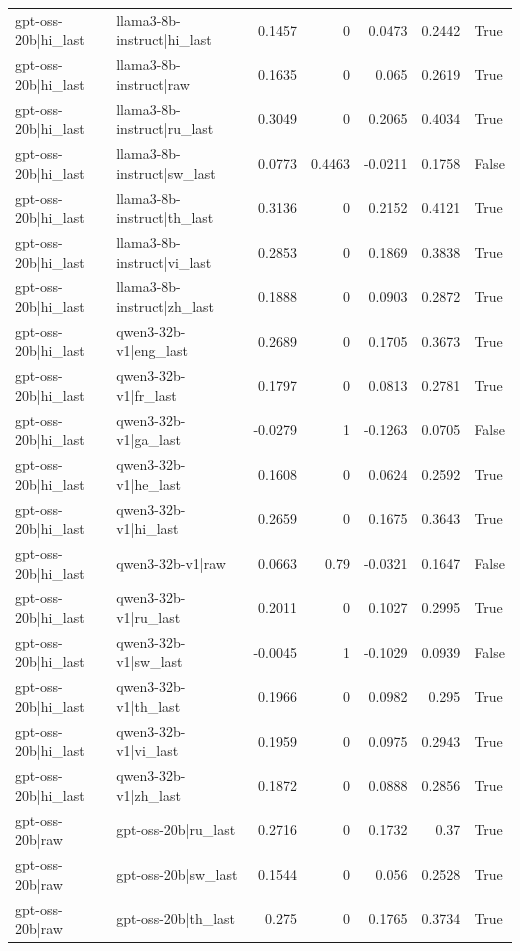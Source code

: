 \begin{table}
\begin{tabular}{l l r r r r l}
gpt-oss-20b|hi_last & llama3-8b-instruct|hi_last & 0.1457 & 0 & 0.0473 & 0.2442 & True \\
gpt-oss-20b|hi_last & llama3-8b-instruct|raw & 0.1635 & 0 & 0.065 & 0.2619 & True \\
gpt-oss-20b|hi_last & llama3-8b-instruct|ru_last & 0.3049 & 0 & 0.2065 & 0.4034 & True \\
gpt-oss-20b|hi_last & llama3-8b-instruct|sw_last & 0.0773 & 0.4463 & -0.0211 & 0.1758 & False \\
gpt-oss-20b|hi_last & llama3-8b-instruct|th_last & 0.3136 & 0 & 0.2152 & 0.4121 & True \\
gpt-oss-20b|hi_last & llama3-8b-instruct|vi_last & 0.2853 & 0 & 0.1869 & 0.3838 & True \\
gpt-oss-20b|hi_last & llama3-8b-instruct|zh_last & 0.1888 & 0 & 0.0903 & 0.2872 & True \\
gpt-oss-20b|hi_last & qwen3-32b-v1|eng_last & 0.2689 & 0 & 0.1705 & 0.3673 & True \\
gpt-oss-20b|hi_last & qwen3-32b-v1|fr_last & 0.1797 & 0 & 0.0813 & 0.2781 & True \\
gpt-oss-20b|hi_last & qwen3-32b-v1|ga_last & -0.0279 & 1 & -0.1263 & 0.0705 & False \\
gpt-oss-20b|hi_last & qwen3-32b-v1|he_last & 0.1608 & 0 & 0.0624 & 0.2592 & True \\
gpt-oss-20b|hi_last & qwen3-32b-v1|hi_last & 0.2659 & 0 & 0.1675 & 0.3643 & True \\
gpt-oss-20b|hi_last & qwen3-32b-v1|raw & 0.0663 & 0.79 & -0.0321 & 0.1647 & False \\
gpt-oss-20b|hi_last & qwen3-32b-v1|ru_last & 0.2011 & 0 & 0.1027 & 0.2995 & True \\
gpt-oss-20b|hi_last & qwen3-32b-v1|sw_last & -0.0045 & 1 & -0.1029 & 0.0939 & False \\
gpt-oss-20b|hi_last & qwen3-32b-v1|th_last & 0.1966 & 0 & 0.0982 & 0.295 & True \\
gpt-oss-20b|hi_last & qwen3-32b-v1|vi_last & 0.1959 & 0 & 0.0975 & 0.2943 & True \\
gpt-oss-20b|hi_last & qwen3-32b-v1|zh_last & 0.1872 & 0 & 0.0888 & 0.2856 & True \\
gpt-oss-20b|raw & gpt-oss-20b|ru_last & 0.2716 & 0 & 0.1732 & 0.37 & True \\
gpt-oss-20b|raw & gpt-oss-20b|sw_last & 0.1544 & 0 & 0.056 & 0.2528 & True \\
gpt-oss-20b|raw & gpt-oss-20b|th_last & 0.275 & 0 & 0.1765 & 0.3734 & True \\

\end{tabular}
\end{table}
